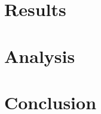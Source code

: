 \documentclass{article}
\begin{document}
\section{Results}























\section{Analysis}

















\section{Conclusion}
\end{document}
